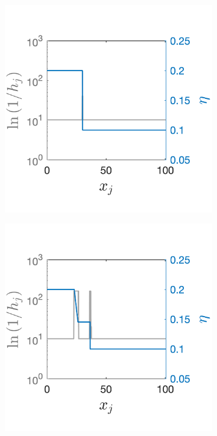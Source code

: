 \documentclass[final]{amsart}
\numberwithin{equation}{section}
\begin{document}
\begin{figure}[H]
	\begin{subfigure}[b]{.25\textwidth}
		\includegraphics[width=\textwidth]{../figures/fig_shw_dambreakSHW_dambreak_RK3_WENO3_rec_3_fixed_gs_stills_1_adaptONOFF}	
		\caption{
			\label{fig_shw_dambreakSHW_dambreak_RK3_WENO3_rec_3_fixed_gs_stills_1_adaptONOFF}
		}
	\end{subfigure}
	\begin{subfigure}[b]{.25\textwidth}
	\includegraphics[width=\textwidth]{../figures/fig_shw_dambreakSHW_dambreak_RK3_WENO3_rec_3_fixed_gs_stills_2001_adaptONOFF}	

\end{subfigure}
\end{figure}
\end{document}
